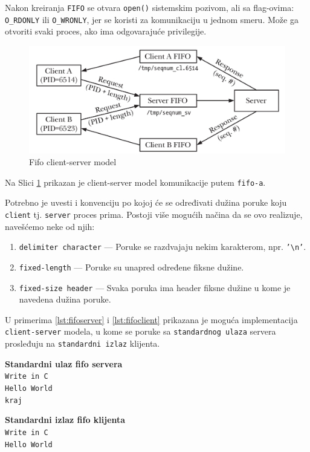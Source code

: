 \documentclass[a4paper, 11pt, twoside]{article}
\newcommand{\scode}[3] {
	\hspace{.06\textwidth} 
	\begin{minipage}[t]{.88\textwidth} %
		\begin{mdframed}[topline=true,bottomline=true,leftline=true,rightline=true,backgroundcolor=gray!22, linecolor=gray!60!black,roundcorner=1mm]
			 

	\begin{center}
		\caption{\textbf{Primer \ref{lst:#3}:} #2}
	\end{center}
	\end{mdframed}
	\end{minipage}

}
\newcommand{\stdio}[4] {
	\hspace{.06\textwidth} 
	\begin{minipage}[t]{.88\textwidth} %
		\begin{mdframed}[backgroundcolor=black!7,topline=true,bottomline=true,leftline=true,rightline=true,roundcorner=1mm]
		\begin{minipage}[t]{.5\textwidth} %
			\textbf{#1} \\
				\texttt{#3}
		\end{minipage}
		\begin{minipage}[t]{.5\textwidth} %
			\textbf{#2} \\
				\texttt{#4}
		\end{minipage}
		\end{mdframed}
	\end{minipage}
	\vspace{3mm} 
}
\begin{document}
Nakon kreiranja \texttt{FIFO} se otvara \texttt{open()} sistemskim pozivom, ali sa flag-ovima: \texttt{O\_RDONLY} ili \texttt{O\_WRONLY}, jer se koristi za komunikaciju u jednom smeru. Može ga otvoriti svaki proces, ako ima odgovarajuće privilegije.

\vspace{1mm} 
\begin{figure}[h]
	\centering
	\includegraphics[width=.7\textwidth]{fifo-client-server.png} %
	\caption{Fifo client-server model}
	\label{fig:fifocs}
\end{figure}

\vspace{2mm} 
Na Slici \ref{fig:fifocs} prikazan je client-server model komunikacije putem \texttt{fifo-a}.

Potrebno je uvesti i konvenciju po kojoj će se određivati dužina poruke koju \texttt{client} tj. \texttt{server} proces prima. Postoji više mogućih načina da se ovo realizuje, navešćemo neke od njih:

\begin{enumerate}[1)]
	\item{\texttt{delimiter character} --- Poruke se razdvajaju nekim karakterom, npr. \texttt{'\textbackslash n'}.}
	\item{\texttt{fixed-length} --- Poruke su unapred određene fiksne dužine.}
	\item{\texttt{fixed-size header} --- Svaka poruka ima header fiksne dužine u kome je navedena dužina poruke.}
\end{enumerate}

\newpage

U primerima \ref{lst:fifoserver} i \ref{lst:fifoclient} prikazana je moguća implementacija \texttt{client-server} modela, u kome se poruke sa \texttt{standardnog ulaza} servera prosleđuju na \texttt{standardni izlaz} klijenta.

\vspace{2mm} 
\scode{fifo_server.c}{Fifo server}{fifoserver}

\scode{fifo_client.c}{Fifo klijent}{fifoclient}
\stdio{Standardni ulaz fifo servera}{Standardni izlaz fifo klijenta}{Write in C \\ Hello World \\ kraj}{Write in C \\ Hello World}
\vspace{2mm} 
\end{document}
